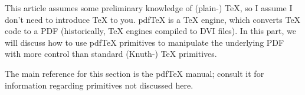 
This article assumes some preliminary knowledge of (plain-) \TeX, so I assume I don't need to introduce
\TeX{} to you.
pdf\TeX{} is a \TeX{} engine, which converts \TeX{} code to a PDF (historically, \TeX{} engines compiled to
DVI files).
In this part, we will discuss how to use pdf\TeX{} primitives to manipulate the underlying PDF with more
control than standard (Knuth-) \TeX{} primitives.

The main reference for this section is the pdf\TeX{} manual; consult it for information regarding primitives
not discussed here.

